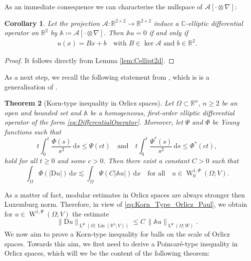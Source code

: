 \documentclass[a4paper,10pt,reqno,oneside]{amsart}
\numberwithin{equation}{section}
\newcommand{\R}{\mathbb R}
\newcommand{\C}{\mathbb C}
\newcommand{\A}{\mathscr{A}}
\newcommand{\Aop}{\mathbb{A}}
\newcommand{\lebe}{\operatorname{L}}
\newcommand{\sobo}{\operatorname{W}}
\newcommand{\D}{\mathrm{D}}
\DeclareMathOperator{\Lin}{Lin}
\newcommand{\dx}[1]{\,\mathrm{d}#1}
\newcommand{\abs}[1]{\left\lvert#1\right\rvert}
\newtheorem{thm}{Theorem}[section]
\newtheorem{cor}[thm]{Corollary}
\begin{document}
As an immediate consequence we can characterise the nullspace of $\A[\cdot\otimes\nabla]$:
\begin{cor}\label{cor:kernel}
 Let the projection $\A:\R^{2\times 2}\to\R^{2\times2}$ induce a $\C$-elliptic differential operator on $\R^2$ by $\Aop\coloneqq\A[\cdot\otimes\nabla]$. Then $\Aop u = 0$ if and only if
 \begin{align*}
  u(x)=Bx +b \quad \text{with } B\in \ker \A \text{ and } b\in\R^2. \end{align*}
\end{cor}
\begin{proof}
 It follows directly from Lemma \ref{lem:Cellipt2d}.
\end{proof}

 As a next step, we recall the following statement from  {\cite[Theorem 5.1]{Stephan}}, which is is a generalisation of \cite[Theorem 3.1]{Cianchi}.
\begin{thm}[Korn-type inequality in Orlicz spaces]
	Let $\Omega\subset\R^n$, $n\geq 2$ be an open and bounded set and $\Aop$ be a homogeneous, first-order elliptic differential operator of the form \eqref{eq:DifferentialOperator}. Moreover, let $\Psi$ and $\Phi$ be Young functions such that 
	\begin{equation}\label{eq:CianchiAssumptionYoungFunctions}
		t \int_0^t \frac{\Phi(s)}{s^2}\dx{s} \leq \Psi(ct) \quad\mbox{and}\quad t\int_0^t \frac{\Psi^\ast(s)}{s^2}\dx{s}\leq \Phi^\ast(ct),
	\end{equation}
	hold for all $t\geq 0$ and some $c>0$. Then there exist a constant $C>0$ such that 
	\begin{equation}\label{eq:Korn_Type_Orlicz_Paul}
		\int_\Omega \Phi(\abs{\D u})\dx{x} \lesssim \int_\Omega \Psi(C\abs{\Aop u})\dx{x}\quad\mbox{for all}\quad u\in \sobo^{1,\Psi}_0(\Omega;V).
	\end{equation}
\end{thm}
\noindent As a matter of fact, modular estimates in Orlicz spaces are always stronger then Luxemburg norm. Therefore, in view of \eqref{eq:Korn_Type_Orlicz_Paul}, we obtain for $u\in \sobo^{1,\Psi}(\Omega;V)$ the estimate
\begin{equation}\label{eq:Korn_Type_Orlicz_Paul_Norm}
	\|\D u \|_{\lebe^\Phi(\Omega;\Lin(\R^n;V))} \leq C\, \|\Aop u\|_{\lebe^\Psi(\Omega;W)}.
\end{equation}
We now aim to prove a Korn-type inequality for balls on the scale of Orlicz spaces. Towards this aim, we first need to derive a Poincar\'{e}-type inequality in Orlicz spaces, which will we be the content of the following theorem:
\end{document}
